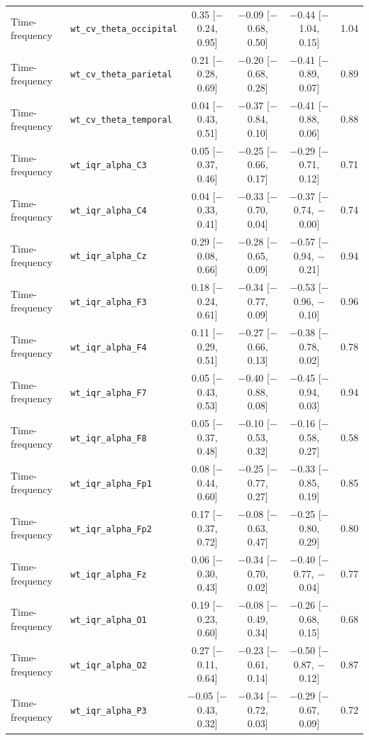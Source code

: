 {\begin{longtable}{llcccc}
Time-frequency & \texttt{wt\_cv\_theta\_occipital} & 0.35 [$-$0.24, 0.95] & $-$0.09 [$-$0.68, 0.50] & $-$0.44 [$-$1.04, 0.15] & 1.04 \\
Time-frequency & \texttt{wt\_cv\_theta\_parietal} & 0.21 [$-$0.28, 0.69] & $-$0.20 [$-$0.68, 0.28] & $-$0.41 [$-$0.89, 0.07] & 0.89 \\
Time-frequency & \texttt{wt\_cv\_theta\_temporal} & 0.04 [$-$0.43, 0.51] & $-$0.37 [$-$0.84, 0.10] & $-$0.41 [$-$0.88, 0.06] & 0.88 \\
Time-frequency & \texttt{wt\_iqr\_alpha\_C3} & 0.05 [$-$0.37, 0.46] & $-$0.25 [$-$0.66, 0.17] & $-$0.29 [$-$0.71, 0.12] & 0.71 \\
Time-frequency & \texttt{wt\_iqr\_alpha\_C4} & 0.04 [$-$0.33, 0.41] & $-$0.33 [$-$0.70, 0.04] & $-$0.37 [$-$0.74, $-$0.00] & 0.74 \\
Time-frequency & \texttt{wt\_iqr\_alpha\_Cz} & 0.29 [$-$0.08, 0.66] & $-$0.28 [$-$0.65, 0.09] & $-$0.57 [$-$0.94, $-$0.21] & 0.94 \\
Time-frequency & \texttt{wt\_iqr\_alpha\_F3} & 0.18 [$-$0.24, 0.61] & $-$0.34 [$-$0.77, 0.09] & $-$0.53 [$-$0.96, $-$0.10] & 0.96 \\
Time-frequency & \texttt{wt\_iqr\_alpha\_F4} & 0.11 [$-$0.29, 0.51] & $-$0.27 [$-$0.66, 0.13] & $-$0.38 [$-$0.78, 0.02] & 0.78 \\
Time-frequency & \texttt{wt\_iqr\_alpha\_F7} & 0.05 [$-$0.43, 0.53] & $-$0.40 [$-$0.88, 0.08] & $-$0.45 [$-$0.94, 0.03] & 0.94 \\
Time-frequency & \texttt{wt\_iqr\_alpha\_F8} & 0.05 [$-$0.37, 0.48] & $-$0.10 [$-$0.53, 0.32] & $-$0.16 [$-$0.58, 0.27] & 0.58 \\
Time-frequency & \texttt{wt\_iqr\_alpha\_Fp1} & 0.08 [$-$0.44, 0.60] & $-$0.25 [$-$0.77, 0.27] & $-$0.33 [$-$0.85, 0.19] & 0.85 \\
Time-frequency & \texttt{wt\_iqr\_alpha\_Fp2} & 0.17 [$-$0.37, 0.72] & $-$0.08 [$-$0.63, 0.47] & $-$0.25 [$-$0.80, 0.29] & 0.80 \\
Time-frequency & \texttt{wt\_iqr\_alpha\_Fz} & 0.06 [$-$0.30, 0.43] & $-$0.34 [$-$0.70, 0.02] & $-$0.40 [$-$0.77, $-$0.04] & 0.77 \\
Time-frequency & \texttt{wt\_iqr\_alpha\_O1} & 0.19 [$-$0.23, 0.60] & $-$0.08 [$-$0.49, 0.34] & $-$0.26 [$-$0.68, 0.15] & 0.68 \\
Time-frequency & \texttt{wt\_iqr\_alpha\_O2} & 0.27 [$-$0.11, 0.64] & $-$0.23 [$-$0.61, 0.14] & $-$0.50 [$-$0.87, $-$0.12] & 0.87 \\
Time-frequency & \texttt{wt\_iqr\_alpha\_P3} & $-$0.05 [$-$0.43, 0.32] & $-$0.34 [$-$0.72, 0.03] & $-$0.29 [$-$0.67, 0.09] & 0.72 \\

\end{longtable}}
